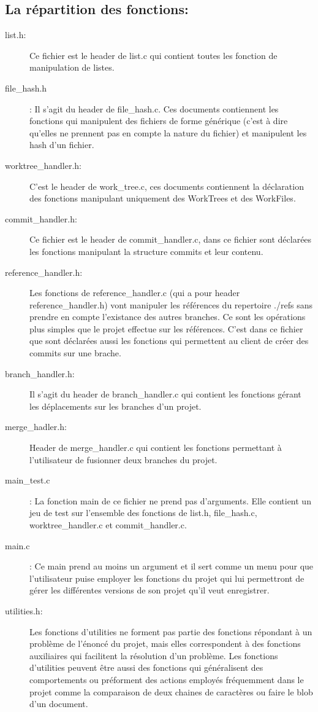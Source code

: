 \documentclass[12pt,francais]{article}
\begin{document}
\subsection{La répartition des fonctions:}
\begin{description}
\item[list.h:] Ce fichier est le header de list.c qui contient toutes les fonction de manipulation de listes.
\item[file\_hash.h]: Il s'agit du header de file\_hash.c. Ces documents contiennent les fonctions qui manipulent des fichiers de forme générique (c'est à dire qu'elles ne prennent pas en compte la nature du fichier) et manipulent les hash d'un fichier.
\item[worktree\_handler.h:] C'est le header de work\_tree.c, ces documents contiennent la déclaration des fonctions manipulant uniquement des WorkTrees et des WorkFiles.
\item[commit\_handler.h:]  Ce fichier est le header de commit\_handler.c, dans ce fichier sont déclarées les fonctions manipulant la structure commits et leur contenu.
\item[reference\_handler.h:] Les fonctions de reference\_handler.c (qui a pour header reference\_handler.h) vont manipuler les références du repertoire ./refs sans prendre en compte l'existance des autres branches. Ce sont les opérations plus simples que le projet effectue sur les références. C'est dans ce fichier que sont déclarées aussi les fonctions qui permettent au client de créer des commits sur une brache.
\item[branch\_handler.h:] Il s'agit du header de branch\_handler.c qui contient les fonctions gérant les déplacements sur les branches d'un projet.
\item[merge\_hadler.h:] Header de merge\_handler.c qui contient les fonctions permettant à l'utilisateur de fusionner deux branches du projet.
\item[main\_test.c]: La fonction main de ce fichier ne prend pas d'arguments. Elle contient un jeu de test sur l'ensemble des fonctions de list.h, file\_hash.c, worktree\_handler.c et commit\_handler.c.
\item[main.c]: Ce main prend au moins un argument et il sert comme un menu pour que l'utilisateur puise employer les fonctions du projet qui lui permettront de gérer les différentes versions de son projet qu'il veut enregistrer.
\item[utilities.h:] Les fonctions d'utilities ne forment pas partie des fonctions répondant à un problème de l'énoncé du projet, mais elles correspondent à des fonctions auxiliaires qui facilitent la résolution d'un problème. Les fonctions d'utilities peuvent être aussi  des fonctions qui généralisent des comportements ou préforment des actions employés fréquemment dans le projet comme la comparaison de deux chaines de caractères ou faire le blob d'un document. 
\end{description}
\end{document}
